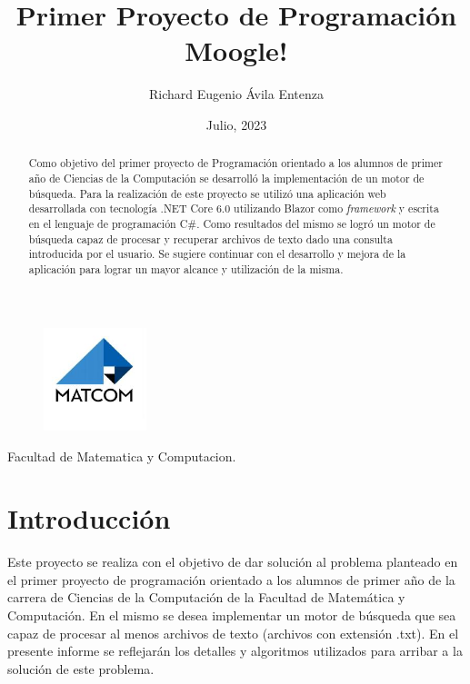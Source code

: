 \documentclass[a4paper,12pt]{article}
\begin{document}
	\title{Primer Proyecto de Programación Moogle!}
	\author{Richard Eugenio Ávila Entenza}
	\date{Julio, 2023}
	\maketitle
	
	\begin{figure}[h]
		\center
		\includegraphics[width=3cm]{matcom.jpg}
		\label{fig:logo}
	\end{figure}	
	\begin{center}
		\Large Facultad de Matematica y Computacion.
	\end{center}

	\newpage
	
	\begin{abstract}
Como objetivo del primer proyecto de Programación orientado a los alumnos de primer año de Ciencias de la Computación se desarrolló la implementación de un motor de búsqueda. Para la realización de este proyecto se utilizó una aplicación web desarrollada con tecnología .NET Core 6.0 utilizando Blazor como \emph{framework} y escrita en el lenguaje de programación C\#. Como resultados del mismo se logró un motor de búsqueda capaz de procesar y recuperar archivos de texto dado una consulta introducida por el usuario. Se sugiere continuar con el desarrollo y mejora de la aplicación para lograr un mayor alcance y utilización de la misma.
	\end{abstract}
	
	\newpage
	\begin{center}
		\tableofcontents		
	\end{center}

	\newpage
	
	\section{Introducción}\label{sec:introduccion}
	
	Este proyecto se realiza con el objetivo de dar solución al problema planteado en el primer proyecto de programación orientado a los alumnos de primer año de la carrera de Ciencias de la Computación de la Facultad de Matemática y Computación. En el mismo se desea implementar un motor de búsqueda que sea capaz de procesar al menos archivos de texto (archivos con extensión .txt). En el presente informe se reflejarán los detalles y algoritmos utilizados para arribar a la solución de este problema. 
	
\end{document}
